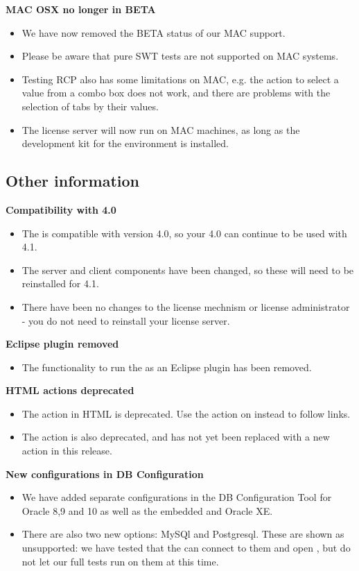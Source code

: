 \textbf{MAC OSX no longer in BETA}
\begin{itemize}
\item We have now removed the BETA status of our MAC support. 
\item Please be aware that pure SWT tests are not supported on MAC systems. 
\item Testing RCP \gdauts{} also has some limitations on MAC, e.g. the action to select a value from a combo box does not work, and there are problems with the selection of tabs by their values. 
\item The license server will now run on MAC machines, as long as the development kit for the environment is installed. 
\end{itemize}

\subsection{Other information}
\textbf{Compatibility with 4.0}
\begin{itemize}
\item The \gddb{} is compatible with version 4.0, so your 4.0 \gddb{} can continue to be used with 4.1.
\item The server and client components have been changed, so these will need to be reinstalled for 4.1.
\item There have been no changes to the license mechnism or license administrator - you do not need to reinstall your license server. 
\end{itemize}
\textbf{Eclipse plugin removed}
\begin{itemize}
\item The functionality to run the \ite{} as an Eclipse plugin has been removed.
\end{itemize}
\textbf{HTML actions deprecated}
\begin{itemize}
\item The action  in HTML is deprecated. Use the action  on  instead to follow links. 
\item The action  is also deprecated, and has not yet been replaced with a new action in this release. 
\end{itemize}
\textbf{New \gddb{} configurations in DB Configuration}
\begin{itemize}
\item We have added separate \gddb{} configurations in the DB Configuration Tool for Oracle 8,9 and 10 as well as the embedded \gddb{} and Oracle XE. 
\item There are also two new options: MySQl and Postgresql. These are shown as unsupported: we have tested that the \ite{} can connect to them and open \gdprojects{}, but do not let our full tests run on them at this time. 
\end{itemize}
